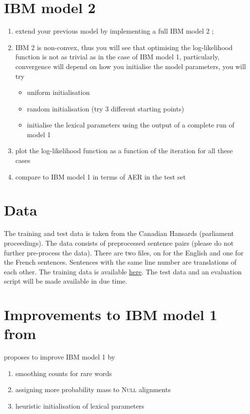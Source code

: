 \section{IBM model 2}

\begin{enumerate}
  \item extend your previous model by implementing a full IBM model 2 \citep{Brown+1993:smt};
  \item IBM 2 is non-convex, thus you will see that optimising the log-likelihood function is 
        not as trivial as in the case of IBM model 1, particularly, convergence will depend 
        on how you initialise the model parameters, you will try
  \begin{itemize}
    \item uniform initialisation
    \item random initialisation (try 3 different starting points)
    \item initialise the lexical parameters using the output of a complete run of model 1
  \end{itemize}
  \item plot the log-likelihood function as a function of the iteration for all these cases
  \item compare to IBM model 1 in terms of AER in the test set
\end{enumerate}

\section{Data}
The training and test data is taken from the Canadian Hansards (parliament proceedings). The data consists
of preprocessed sentence pairs (please do not further pre-process the data). There are two files, on for the
English and one for the French sentences. Sentences with the same line number are translations of each other.
The training data is available \href{https://github.com/wilkeraziz/uva-nlp2/blob/gh-pages/resources/project1/NLP2_Project1_data.tar.gz}{here}. The test data and an evaluation script will be made available in due time.

\section{Improvements to IBM model 1 from \cite{Moore:2004:IBM1}}

\citet{Moore:2004:IBM1} proposes to improve IBM model 1 by
\begin{enumerate} 
  \item smoothing counts for rare words
  \item assigning more probability mass to \textsc{Null} alignments
  \item heuristic initialisation of lexical parameters
\end{enumerate}

